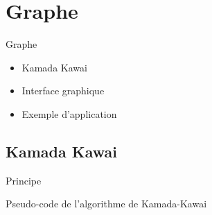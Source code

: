 \documentclass[aspectratio=169,xcolor=dvipsnames]{beamer}
\begin{document}
\section{Graphe}
\begin{frame}{Graphe}
    \begin{center}
    \begin{itemize}
        \item Kamada Kawai
        \item Interface graphique
        \item Exemple d'application
    \end{itemize}
    \end{center}
\end{frame}
\subsection{Kamada Kawai}
    \begin{frame}{Principe}
        \begin{algorithm}[H]
        \caption{Pseudo-code de l'algorithme de Kamada-Kawai}\label{alg:cap}
        
        
        \end{algorithm}
    \end{frame}
    
\end{document}
